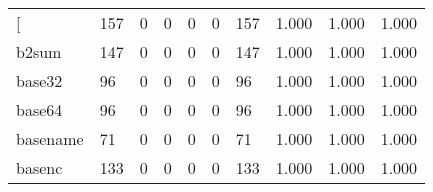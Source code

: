 \begin{longtable}{lp{1.3cm}p{1.3cm}p{1.3cm}p{1.3cm}p{1.3cm}p{1.3cm}p{1.3cm}p{1.3cm}p{1.3cm}}
\bottomrule
\endlastfoot
{[}         &                    157 &                                             0 &                                            0 &                                           0 &                                            0 &                                        157 &                                1.000 &                                  1.000 &                                1.000 \\
b2sum     &                    147 &                                             0 &                                            0 &                                           0 &                                            0 &                                        147 &                                1.000 &                                  1.000 &                                1.000 \\
base32    &                     96 &                                             0 &                                            0 &                                           0 &                                            0 &                                         96 &                                1.000 &                                  1.000 &                                1.000 \\
base64    &                     96 &                                             0 &                                            0 &                                           0 &                                            0 &                                         96 &                                1.000 &                                  1.000 &                                1.000 \\
basename  &                     71 &                                             0 &                                            0 &                                           0 &                                            0 &                                         71 &                                1.000 &                                  1.000 &                                1.000 \\
basenc    &                    133 &                                             0 &                                            0 &                                           0 &                                            0 &                                        133 &                                1.000 &                                  1.000 &                                1.000 \\

\end{longtable}
